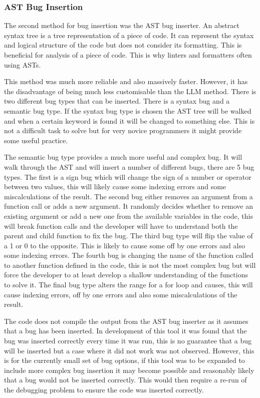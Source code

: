 \documentclass[12pt]{extarticle}
\begin{document}
\subsubsection{AST Bug Insertion}

The second method for bug insertion was the AST bug inserter. An abstract syntax tree is a tree representation of a piece of code. It can represent the syntax and logical structure of the code but does not consider its formatting. This is beneficial for analysis of a piece of code. This is why linters and formatters often using ASTs.

This method was much more reliable and also massively faster. However, it has the disadvantage of being much less customisable than the LLM method. There is two different bug types that can be inserted. There is a syntax bug and a semantic bug type. If the syntax bug type is chosen the AST tree will be walked and when a certain keyword is found it will be changed to something else. This is not a difficult task to solve but for very novice programmers it might provide some useful practice.

The semantic bug type provides a much more useful and complex bug. It will walk through the AST and will insert a number of different bugs, there are 5 bug types. The first is a sign bug which will change the sign of a number or operator between two values, this will likely cause some indexing errors and some miscalculations of the result. The second bug either removes an argument from a function call or adds a new argument. It randomly decides whether to remove an existing argument or add a new one from the available variables in the code, this will break function calls and the developer will have to understand both the parent and child function to fix the bug. The third bug type will flip the value of a 1 or 0 to the opposite. This is likely to cause some off by one errors and also some indexing errors. The fourth bug is changing the name of the function called to another function defined in the code, this is not the most complex bug but will force the developer to at least develop a shallow understanding of the functions to solve it. The final bug type alters the range for a for loop and causes, this will cause indexing errors, off by one errors and also some miscalculations of the result.

The code does not compile the output from the AST bug inserter as it assumes that a bug has been inserted. In development of this tool it was found that the bug was inserted correctly every time it was run, this is no guarantee that a bug will be inserted but a case where it did not work was not observed. However, this is for the currently small set of bug options, if this tool was to be expanded to include more complex bug insertion it may become possible and reasonably likely that a bug would not be inserted correctly. This would then require a re-run of the debugging problem to ensure the code was inserted correctly.
\end{document}
